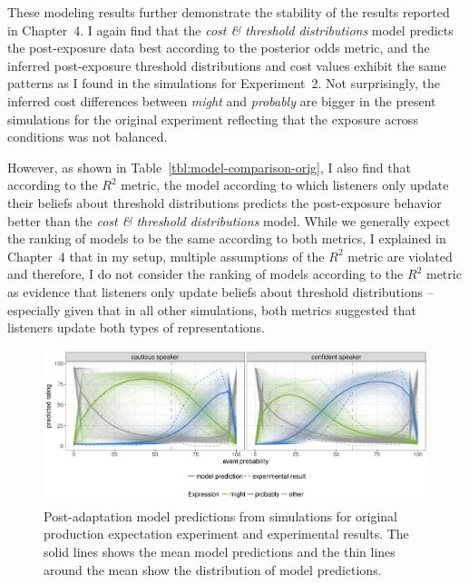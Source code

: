 These modeling results further demonstrate the stability of the results reported in Chapter~4. I again find that the \textit{cost \& threshold distributions} model predicts the post-exposure data best according to the posterior odds metric, and the inferred post-exposure threshold distributions and cost values exhibit the same patterns as I found in the simulations for Experiment~2. Not surprisingly, the inferred cost differences between \textit{might} and \textit{probably} are bigger in the present simulations for the original experiment reflecting that the exposure across conditions was not balanced. 

However, as shown in Table~\ref{tbl:model-comparison-orig}, I also find that according to the $R^2$ metric, the model according to which listeners only update their beliefs about threshold distributions predicts the post-exposure
behavior better than the  \textit{cost \& threshold distributions} model. While we generally expect the ranking of models to be the same according to both metrics, I explained in Chapter~4 that in my setup, multiple assumptions
of the $R^2$ metric are violated and therefore, I do not consider the ranking of models according to the $R^2$ metric as evidence that listeners only update beliefs about threshold distributions -- especially given that in all other simulations, both metrics suggested that listeners update both types of representations.





\begin{figure}[h!]
  \includegraphics[width=\textwidth]{plots/fig-F1-adaptation-posterior-predictions.pdf}
  \caption{Post-adaptation model predictions from simulations for original production expectation experiment and experimental results. 
  The solid lines shows the mean model predictions and the thin lines around the mean show the distribution of model predictions. \label{fig:post-exposure-model-original}}
\end{figure}


